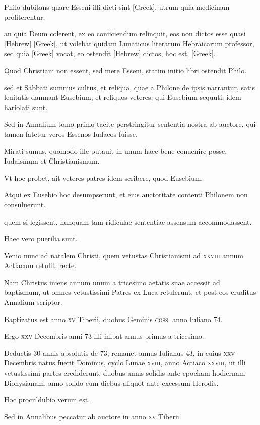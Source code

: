 \begin{parnumbers}
Philo dubitans
quare Esseni illi dicti sint \textgreek{[Greek]},
 utrum quia medicinam profiterentur,

an quia Deum colerent, ex eo coniiciendum relinquit,
eos non dictos esse quasi \texthebrew{[Hebrew]} \textgreek{[Greek]},
 ut volebat quidam Lunaticus
literarum Hebraicarum professor, sed quia \textgreek{[Greek]} vocat, eo ostendit
\texthebrew{[Hebrew]} dictos, hoc est, \textgreek{[Greek]}.

Quod Christiani non essent, sed
mere Esseni, statim initio libri ostendit Philo.

sed et Sabbati summus
cultus, et reliqua, quae a Philone de ipsis narrantur, satis leuitatis
damnant Eusebium, et reliquos veteres, qui Eusebium sequuti,
idem hariolati sunt.

Sed in Annalium tomo primo tacite perstringitur
sententia nostra ab auctore, qui tamen fatetur veros Essenos Iudaeos
fuisse.

Mirati sumus, quomodo ille putauit in unum haec bene
conuenire posse, Iudaismum et Christianismum.

Vt hoc probet, ait
veteres patres idem scribere, quod Eusebium.

Atqui ex Eusebio
hoc desumpserunt, et eius auctoritate contenti Philonem non consuluerunt.

quem si legissent, nunquam tam ridiculae sententiae assensum
accommodassent.

Haec vero puerilia sunt.

Venio nunc ad natalem
Christi, quem vetustas Christianismi ad \textsc{xxviii} annum Actiacum
retulit, recte.

Nam Christus iniens annum unum a tricesimo
aetatis suae accessit ad baptismum, ut omnes vetustissimi Patres ex
Luca retulerunt, et post eos eruditus Annalium scriptor.

Baptizatus est anno \textsc{xv} Tiberii, duobus Geminis \textsc{coss}. anno
Iuliano 74.

Ergo \textsc{xxv} Decembris anni 73 illi inibat annus primus a tricesimo.

Deductis 30 annis absolutis de 73, remanet annus Iulianus
43, in cuius \textsc{xxv} Decembris natus fuerit Dominus, cyclo Lunae
\textsc{xviii}, anno Actiaco \textsc{xxviii},
 ut illi vetustissimi partes crediderunt,
duobus annis solidis ante epocham hodiernam Dionysianam,
anno solido cum diebus aliquot ante excessum Herodis.

Hoc proculdubio
verum est.

Sed in Annalibus peccatur ab auctore in anno
\textsc{xv} Tiberii.


\end{parnumbers}

